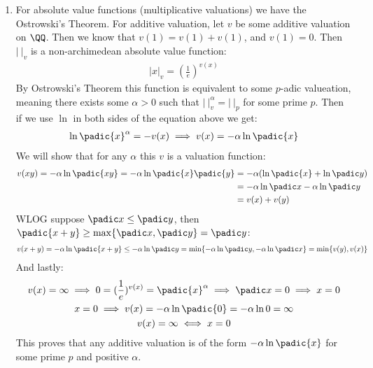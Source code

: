 \begin{enumerate}[label=]
    \item 
		For absolute value functions (multiplicative valuations) we have the Ostrowski's Theorem. For additive valuation,
		let $v$ be some additive valuation on $\QQ$. Then we know that $v(1) = v(1) + v(1)$, and $v(1) = 0$. Then $| \ |_v$ is a non-archimedean absolute value function:
		\begin{gather*}
			| x |_v = (\frac{1}{e})^{v(x)}
		\end{gather*}
		By Ostrowski's Theorem this function is equivalent to some $p$-adic valueation, meaning there exists some $\alpha > 0$ such that $| \ |_v^\alpha = | \ |_p$ for some prime $p$. Then if we use $\ln$ in both sides of the equation above we get:
		\begin{gather*}
			\ln \padic{x}^\alpha = - v(x) \implies v(x) = - \alpha \ln \padic{x}
		\end{gather*}
		We will show that for any $\alpha$ this $v$ is a valuation function:
		\begin{gather*}
			\begin{split}
				v(xy) = - \alpha \ln \padic{xy} = -\alpha \ln \padic{x} \padic{y} & = - \alpha (\ln \padic{x} + \ln \padic y)  \\
				& = -\alpha \ln \padic x - \alpha \ln \padic y \\
				& = v(x) + v(y)
			\end{split}
		\end{gather*}
		WLOG suppose $\padic x \le \padic y$, then $\padic{x + y} \ge \max \{\padic x, \padic y \} = \padic y$:
		\begin{gather*}
			v(x + y) = - \alpha \ln \padic{x + y} \le - \alpha \ln \padic y = \min \{- \alpha \ln \padic y, - \alpha \ln \padic x \} = \min \{ v(y), v(x) \}
		\end{gather*}
		And lastly:
		\begin{gather*}
			v(x) = \infty \implies 0 = (\frac{1}{e})^{v(x)} = \padic{x}^\alpha \implies \padic x = 0 \implies x = 0 \\
			x = 0 \implies v(x) = - \alpha \ln \padic{0} = - \alpha \ln 0 = \infty \\
			v(x) = \infty \iff x = 0
		\end{gather*}
		This proves that any additive valuation is of the form $- \alpha \ln \padic{x}$ for some prime $p$ and positive $\alpha$.
\end{enumerate}